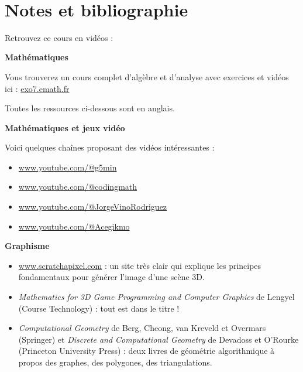 
~
\clearemptydoublepage
\pagestyle{empty}\thispagestyle{empty}


\section*{Notes et bibliographie}

Retrouvez ce cours en vidéos : 


\textbf{Mathématiques}

Vous trouverez un cours complet d'algèbre et d'analyse avec exercices et vidéos ici : {\href{http://exo7.emath.fr/}{exo7.emath.fr}}

\smallskip

Toutes les ressources ci-dessous sont en anglais.


\smallskip


\textbf{Mathématiques et jeux vidéo}

Voici quelques chaînes proposant des vidéos intéressantes :
\begin{itemize}	
  \item \href{https://www.youtube.com/@g5min}{www.youtube.com/@g5min}

  \item \href{https://www.youtube.com/@codingmath}{www.youtube.com/@codingmath}

  \item \href{https://www.youtube.com/@JorgeVinoRodriguez}{www.youtube.com/@JorgeVinoRodriguez}

  \item \href{https://www.youtube.com/@Acegikmo}{www.youtube.com/@Acegikmo}
\end{itemize}

\smallskip

\textbf{Graphisme}

\begin{itemize}
	\item \href{https://www.scratchapixel.com/}{www.scratchapixel.com} : un site très clair qui explique les principes fondamentaux pour générer l'image d'une scène 3D.
	
    \item \emph{Mathematics for	3D Game Programming	and Computer Graphics} de Lengyel (Course Technology) : tout est dans le titre !	
	
	\item \emph{Computational Geometry} de Berg, Cheong, van Kreveld et Overmars (Springer) et 
	\emph{Discrete and Computational Geometry} de Devadoss et O'Rourke (Princeton University Press) :
	deux livres de géométrie algorithmique à propos des graphes, des polygones, des triangulations.

\end{itemize}

